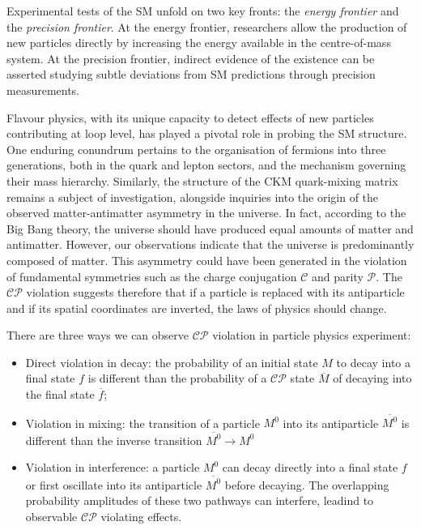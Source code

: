 Experimental tests of the SM unfold on two key fronts: the \textit{energy frontier} and the \textit{precision frontier}. At the energy frontier, researchers allow the production of new particles directly by increasing the energy available in the centre-of-mass system. At the precision frontier, indirect evidence of the existence can be asserted studying subtle deviations from SM predictions through precision measurements. 

Flavour physics, with its unique capacity to detect effects of new particles contributing at loop level, has played a pivotal role in probing the SM structure. One enduring conundrum pertains to the organisation of fermions into three generations, both in the quark and lepton sectors, and the mechanism governing their mass hierarchy. Similarly, the structure of the CKM quark-mixing matrix remains a subject of investigation, alongside inquiries into the origin of the observed matter-antimatter asymmetry in the universe. In fact, according to the Big Bang theory, the universe should have produced equal amounts of matter and antimatter. However, our observations indicate that the universe is predominantly composed of matter. This asymmetry could have been generated in the violation of fundamental symmetries such as the charge conjugation $\mathcal{C}$ and parity $\mathcal{P}$. The $\mathcal{CP}$ violation suggests therefore that if a particle is replaced with its antiparticle and if its spatial coordinates are inverted, the laws of physics should change. 

There are three ways we can observe $\mathcal{CP}$ violation in particle physics experiment:
 \begin{itemize}
     \item Direct violation in decay: the probability of an initial state $M$ to decay into a final state $f$ is different than the probability of a $\mathcal{CP}$ state $\overline{M}$ of decaying into the final state $\overline{f}$;
     \item Violation in mixing: the transition of a particle $M^0$ into its antiparticle $\overline{M^0}$ is different than the inverse transition $\overline{M^0}\longrightarrow M^0$
     \item Violation in interference: a particle $M^0$ can decay directly into a final state $f$ or first oscillate into its antiparticle $\overline{M^0}$ before decaying. The overlapping probability amplitudes of these two pathways can interfere, leadind to observable $\mathcal{CP}$ violating effects.
 \end{itemize}
 
